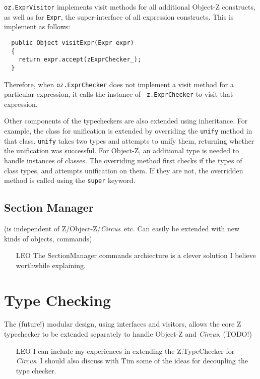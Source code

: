 \documentclass{llncs}
\newcommand{\Circus}{{\sf\slshape Circus}}
\begin{document}
{\tt oz.ExprVisitor} implements visit methods for all additional
Object-Z constructs, as well as for {\tt Expr}, the super-interface of
all expression constructs. This is implement as follows:

\begin{verbatim}
  public Object visitExpr(Expr expr)
  {
    return expr.accept(zExprChecker_);
  }
\end{verbatim}

Therefore, when {\tt oz.ExprChecker} does not implement a visit method
for a particular expression, it calls the instance of {\tt
  z.ExprChecker} to visit that expression.

Other components of the typecheckers are also extended using
inheritance. For example, the class for unification is extended by
overriding the {\tt unify} method in that class. {\tt unify} takes two
types and attempts to unify them, returning whether the unification
was successful. For Object-Z, an additional type is needed to handle
instances of classes. The overriding method first checks if the types
of class types, and attempts unification on them. If they are not, the
overridden method is called using the {\tt super} keyword.


\subsection{Section Manager}

  (is independent of Z/Object-Z/\Circus\ etc.
  Can easily be extended with new kinds of objects, commands)

    \begin{itemize}
        \item[LEO] The SectionManager commands archiecture is a clever solution I believe worthwhile explaining.
    \end{itemize}

\section{Type Checking}

      The (future!) modular design, using interfaces and visitors,
      allows the core Z typechecker to be extended separately
      to handle Object-Z and \Circus.  (TODO!)

    \begin{itemize}
        \item[LEO] I can include my experiences in extending the Z:TypeChecker for \Circus.
                    I should also discuss with Tim some of the ideas for decoupling the type checker.
    \end{itemize}
\end{document}
